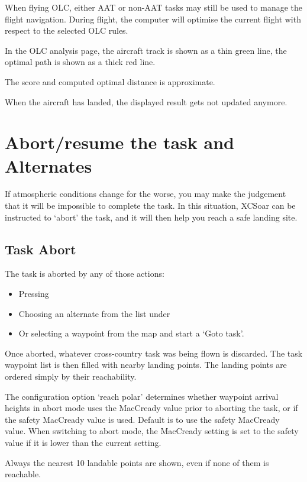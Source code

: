 When flying OLC, either AAT or non-AAT tasks may still be used to
manage the flight navigation.  During flight, the computer will optimise the
current flight with respect to the selected OLC rules.  

In the OLC analysis page, the aircraft track is shown as a thin green line, the optimal 
path is shown as a thick red line.

The score and computed optimal distance is approximate.

When the aircraft has landed, the displayed result gets not updated anymore.


\section{Abort/resume the task and Alternates}

If atmospheric conditions change for the worse, you may make the
judgement that it will be impossible to complete the task.  In this
situation, XCSoar can be instructed to `abort' the task, and it will
then help you reach a safe landing site.

\subsection*{Task Abort}\label{sec:taskabort}
The task is aborted by any of those actions:
\begin{itemize}
\item Pressing \blink{}
\item Choosing an alternate from the list under  
 \blink{}
\item Or selecting a waypoint from the map and start a `Goto task'.
\end{itemize}

Once aborted, whatever cross-country task was being flown is
discarded.  The task waypoint list is then filled with nearby landing
points. The landing points are ordered simply by their reachability.

The configuration option `reach polar' determines whether
waypoint arrival heights in abort mode uses the MacCready value prior
to aborting the task, or if the safety MacCready value is used. 
Default is to use the safety MacCready value.  When switching to
abort mode, the MacCready setting is set to the safety value 
if it is lower than the current setting.

Always the nearest 10 landable points are shown, even if none 
of them is reachable.

